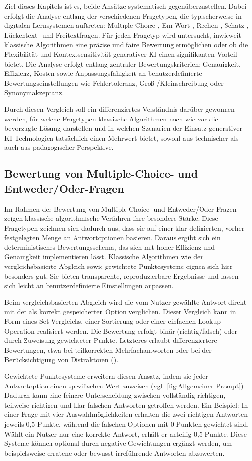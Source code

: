 \documentclass[a4paper,12pt]{article}
\begin{document}
Ziel dieses Kapitels ist es, beide Ansätze systematisch gegenüberzustellen. Dabei erfolgt die Analyse entlang der verschiedenen Fragetypen, die typischerweise in digitalen Lernsystemen auftreten: Multiple-Choice-, Ein-Wort-, Rechen-, Schätz-, Lückentext- und Freitextfragen. Für jeden Fragetyp wird untersucht, inwieweit klassische Algorithmen eine präzise und faire Bewertung ermöglichen oder ob die Flexibilität und Kontextsensitivität generativer KI einen signifikanten Vorteil bietet. Die Analyse erfolgt entlang zentraler Bewertungskriterien: Genauigkeit, Effizienz, Kosten sowie Anpassungsfähigkeit an benutzerdefinierte Bewertungseinstellungen wie Fehlertoleranz, Groß-/Kleinschreibung oder Synonymakzeptanz.

Durch diesen Vergleich soll ein differenziertes Verständnis darüber gewonnen werden, für welche Fragetypen klassische Algorithmen nach wie vor die bevorzugte Lösung darstellen und in welchen Szenarien der Einsatz generativer KI-Technologien tatsächlich einen Mehrwert bietet, sowohl aus technischer als auch aus pädagogischer Perspektive.

\subsection{Bewertung von Multiple-Choice- und Entweder/Oder-Fragen}
Im Rahmen der Bewertung von Multiple-Choice- und Entweder/Oder-Fragen zeigen klassische algorithmische Verfahren ihre besondere Stärke. Diese Fragetypen zeichnen sich dadurch aus, dass sie auf einer klar definierten, vorher festgelegten Menge an Antwortoptionen basieren. Daraus ergibt sich ein deterministisches Bewertungsschema, das sich mit hoher Effizienz und Genauigkeit implementieren lässt. Klassische Algorithmen wie der vergleichsbasierte Abgleich sowie gewichtete Punktesysteme eignen sich hier besonders gut. Sie bieten transparente, reproduzierbare Ergebnisse und lassen sich leicht an benutzerdefinierte Einstellungen anpassen.

Beim vergleichsbasierten Abgleich wird die vom Nutzer gewählte Antwort direkt mit der als korrekt gespeicherten Option verglichen. Dieser Vergleich kann in Form eines Set-Vergleichs, einer Sortierung oder einer einfachen Lookup-Operation realisiert werden. Die Bewertung erfolgt binär (richtig/falsch) oder durch Zuweisung gewichteter Punkte. Letzteres erlaubt differenziertere Bewertungen, etwa bei teilkorrekten Mehrfachantworten oder bei der Berücksichtigung von Distraktoren (\cite{RoedigerMarsh2005}).

Gewichtete Punktesysteme erweitern diesen Ansatz, indem sie jeder Antwortoption einen spezifischen Wert zuweisen (vgl. \ref{fig:Allgemeiner Prompt}). Dadurch kann eine feinere Unterscheidung zwischen vollständig richtigen, teilweise richtigen und klar falschen Antworten getroffen werden. Ein Beispiel: In einer Frage mit vier Auswahlmöglichkeiten erhalten die zwei richtigen Antworten jeweils 0,5 Punkte, während die falschen Optionen mit 0 Punkten gewichtet sind. Wählt ein Nutzer nur eine korrekte Antwort, erhält er anteilig 0,5 Punkte. Diese Systeme können optional durch negative Gewichtungen ergänzt werden, um beispielsweise erratene oder bewusst irreführende Antworten abzuwerten.
\end{document}
